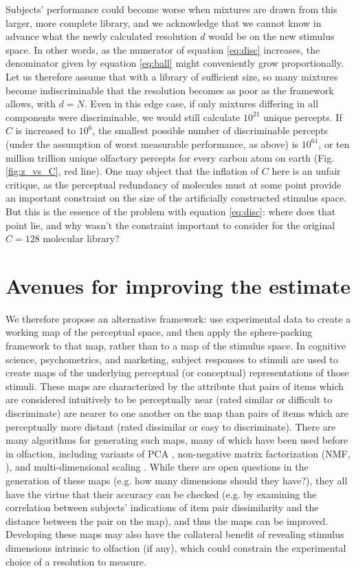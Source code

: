 \documentclass[letterpaper,twocolumn,10pt]{article}
\begin{document}
Subjects' performance could become worse when mixtures are drawn from this larger, more complete library, 
and we acknowledge that we cannot know in advance what the newly calculated resolution $d$ would be on the new stimulus space.  
In other words, as the numerator of equation \ref{eq:disc} increases, 
the denominator given by equation \ref{eq:ball} might conveniently grow proportionally.  
Let us therefore assume that with a library of sufficient size, 
so many mixtures become indiscriminable that the resolution becomes as poor as the framework allows, with $d=N$. 
Even in this edge case, if only mixtures differing in all components were discriminable, 
we would still calculate $10^{21}$ unique percepts. 
If $C$ is increased to $10^6$, 
the smallest possible number of discriminable percepts 
(under the assumption of worst measurable performance, as above) 
is $10^{61}$, or ten million trillion unique olfactory percepts for every carbon atom on earth (Fig. \ref{fig:z_vs_C}, red line). 
One may object that the inflation of $C$ here is an unfair critique, 
as the perceptual redundancy of molecules must at some point provide an important constraint on the size of the artificially constructed stimulus space. 
But this is the essence of the problem with equation \ref{eq:disc}: 
where does that point lie, 
and why wasn’t the constraint important to consider for the original $C=128$ molecular library?

\section{Avenues for improving the estimate}

We therefore propose an alternative framework: 
use experimental data to create a working map of the perceptual space, 
and then apply the sphere-packing framework to that map, 
rather than to a map of the stimulus space.  
In cognitive science, psychometrics, and marketing, subject responses to stimuli are used 
to create maps of the underlying perceptual (or conceptual) representations of those stimuli.  
These maps are characterized by the attribute that pairs of items which are considered intuitively to be perceptually near 
(rated similar or difficult to discriminate) are nearer to one another on the map than pairs of items 
which are perceptually more distant (rated dissimilar or easy to discriminate).  
There are many algorithms for generating such maps, 
many of which have been used before in olfaction, 
including variants of PCA \cite{khan_predicting_2007,koulakov_in_search_2011,zarzo_identification_2006}, 
non-negative matrix factorization (NMF, \cite{castro_categorical_2013}), 
and multi-dimensional scaling \cite{mamlouk_quantifying_2003}.  
While there are open questions in the generation of these maps 
(e.g. how many dimensions should they have?), 
they all have the virtue that their accuracy can be checked 
(e.g. by examining the correlation between subjects' indications of item pair dissimilarity and the distance between the pair on the map), 
and thus the maps can be improved. 
Developing these maps may also have the collateral benefit of revealing stimulus dimensions intrinsic to olfaction (if any), 
which could constrain the experimental choice of a resolution to measure.
\end{document}
